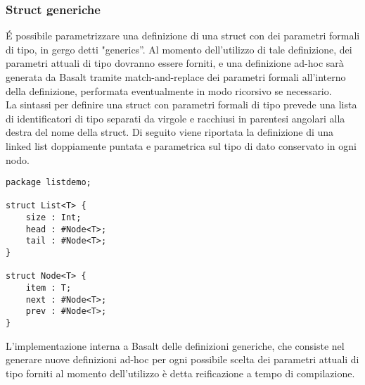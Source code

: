 \subsubsection{Struct generiche}
É possibile parametrizzare una definizione di una struct con dei parametri formali di tipo, in gergo detti "generics”. Al 
momento dell’utilizzo di tale definizione, dei parametri attuali di tipo dovranno essere forniti, e una definizione ad-hoc 
sarà generata da Basalt tramite match-and-replace dei parametri formali all’interno della definizione, 
performata eventualmente in modo ricorsivo se necessario.\\ 

La sintassi per definire una struct con parametri formali di tipo prevede una lista di identificatori di 
tipo separati da virgole e racchiusi in parentesi angolari alla destra del nome della struct. Di seguito 
viene riportata la definizione di una linked list doppiamente puntata e parametrica sul tipo di dato conservato in ogni nodo. \\

\vspace{0.5cm}
\begin{lstlisting}[frame=single]
package listdemo;

struct List<T> {
    size : Int;
    head : #Node<T>;
    tail : #Node<T>;
}

struct Node<T> { 
    item : T;
    next : #Node<T>;
    prev : #Node<T>;
}
\end{lstlisting}
\vspace{0.5cm}

L’implementazione interna a Basalt delle definizioni generiche, che consiste nel generare nuove definizioni 
ad-hoc per ogni possibile scelta dei parametri attuali di tipo forniti al momento 
dell’utilizzo è detta reificazione a tempo di compilazione. \\